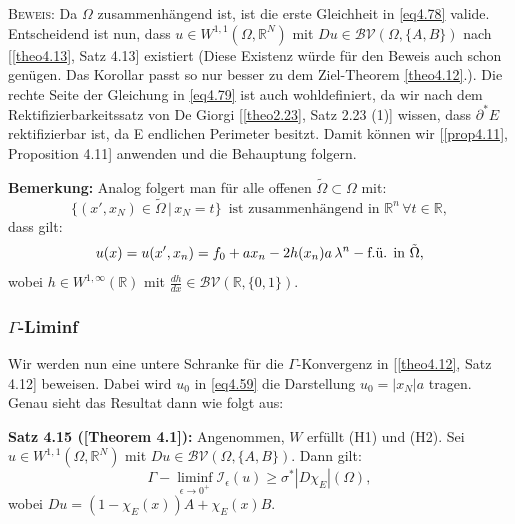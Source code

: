 \textsc{Beweis:} Da \(\Omega\) zusammenhängend ist, ist die erste Gleichheit in \eqref{eq4.78} valide. Entscheidend ist nun, dass \(u \in W^{1,1}(\Omega,\mathbb{R}^N)\) mit \(Du \in \mathcal{BV}(\Omega,\{A,B\})\) nach [\ref{theo4.13}, Satz 4.13] existiert (Diese Existenz würde für den Beweis auch schon genügen. Das Korollar passt so nur besser zu dem Ziel-Theorem \eqref{theo4.12}.). Die rechte Seite der Gleichung in \eqref{eq4.79} ist auch wohldefiniert, da wir nach dem Rektifizierbarkeitssatz von De Giorgi [\ref{theo2.23}, Satz 2.23 (1)] wissen, dass \(\partial^* E\) rektifizierbar ist, da E endlichen Perimeter besitzt. Damit können wir [\ref{prop4.11}, Proposition 4.11] anwenden und die Behauptung folgern. \QEDB

\textbf{Bemerkung:} Analog folgert man für alle offenen \(\tilde{\Omega} \subset \Omega\) mit:
\begin{equation}
    \{(x',x_N) \in \tilde{\Omega} \, | \, x_N = t\} \, \text{ ist zusammenhängend in }\mathbb{R}^n \, \forall t \in \mathbb{R},
\end{equation}
dass gilt:
\begin{equation}{\label{eq4.81}}
    u(x) = u(x',x_n) = f_0 + ax_n - 2h(x_n)a \, \lambda^n-\text{f.ü. in }\tilde{\Omega}, 
\end{equation}
wobei \(h \in W^{1,\infty}(\mathbb{R})\) mit \(\frac{dh}{dx} \in \mathcal{BV}(\mathbb{R},\{0,1\})\).

\subsubsection{\(\Gamma\)-Liminf}
Wir werden nun eine untere Schranke für die \(\Gamma\)-Konvergenz in [\ref{theo4.12}, Satz 4.12] beweisen. Dabei wird \(u_0\) in \eqref{eq4.59} die Darstellung \(u_0 = |x_N|a\) tragen. Genau sieht das Resultat dann wie folgt aus:\\[0.5cm]
\colorbox{generalYellow}{\begin{minipage}{16cm}{\textcolor{black}{}{\label{theo4.15}}}
\textbf{Satz 4.15 (\cite{ContiTwoGradientPhase}[Theorem 4.1]):} Angenommen, \(W\) erfüllt (H1) und (H2). Sei \(u \in W^{1,1}(\Omega,\mathbb{R}^N)\) mit \(Du \in \mathcal{BV}(\Omega,\{A,B\})\). Dann gilt:
\begin{equation}
    \Gamma-\liminf_{\epsilon \to 0^+} \mathcal{I}_{\epsilon}(u) \geq \sigma^* |D\chi_E| (\Omega),
\end{equation}
wobei \(Du = (1- \chi_E(x))A + \chi_E (x)B\).
\end{minipage}}


